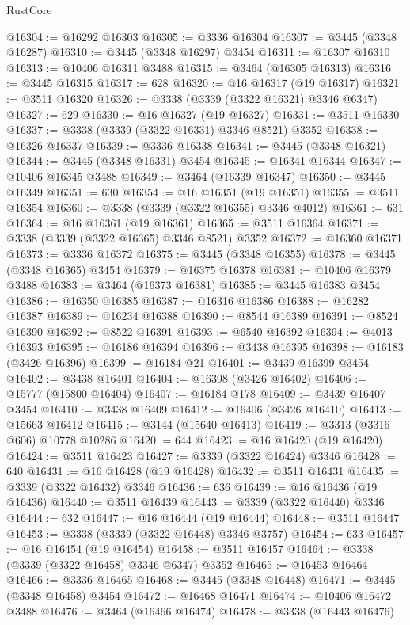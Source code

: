 \begin{lexlean}{RustCore}
\begin{coremodule}
@16304 := @16292 @16303
@16305 := @3336 @16304
@16307 := @3445 (@3348 @16287)
@16310 := @3445 (@3348 @16297) @3454
@16311 := @16307 @16310
@16313 := @10406 @16311 @3488
@16315 := @3464 (@16305 @16313)
@16316 := @3445 @16315
@16317 := 628
@16320 := @16 @16317 (@19 @16317)
@16321 := @3511 @16320
@16326 := @3338 (@3339 (@3322 @16321) @3346 @6347)
@16327 := 629
@16330 := @16 @16327 (@19 @16327)
@16331 := @3511 @16330
@16337 := @3338 (@3339 (@3322 @16331) @3346 @8521) @3352
@16338 := @16326 @16337
@16339 := @3336 @16338
@16341 := @3445 (@3348 @16321)
@16344 := @3445 (@3348 @16331) @3454
@16345 := @16341 @16344
@16347 := @10406 @16345 @3488
@16349 := @3464 (@16339 @16347)
@16350 := @3445 @16349
@16351 := 630
@16354 := @16 @16351 (@19 @16351)
@16355 := @3511 @16354
@16360 := @3338 (@3339 (@3322 @16355) @3346 @4012)
@16361 := 631
@16364 := @16 @16361 (@19 @16361)
@16365 := @3511 @16364
@16371 := @3338 (@3339 (@3322 @16365) @3346 @8521) @3352
@16372 := @16360 @16371
@16373 := @3336 @16372
@16375 := @3445 (@3348 @16355)
@16378 := @3445 (@3348 @16365) @3454
@16379 := @16375 @16378
@16381 := @10406 @16379 @3488
@16383 := @3464 (@16373 @16381)
@16385 := @3445 @16383 @3454
@16386 := @16350 @16385
@16387 := @16316 @16386
@16388 := @16282 @16387
@16389 := @16234 @16388
@16390 := @8544 @16389
@16391 := @8524 @16390
@16392 := @8522 @16391
@16393 := @6540 @16392
@16394 := @4013 @16393
@16395 := @16186 @16394
@16396 := @3438 @16395
@16398 := @16183 (@3426 @16396)
@16399 := @16184 @21
@16401 := @3439 @16399 @3454
@16402 := @3438 @16401
@16404 := @16398 (@3426 @16402)
@16406 := @15777 (@15800 @16404)
@16407 := @16184 @178
@16409 := @3439 @16407 @3454
@16410 := @3438 @16409
@16412 := @16406 (@3426 @16410)
@16413 := @15663 @16412
@16415 := @3144 (@15640 @16413)
@16419 := @3313 (@3316 @606) @10778 @10286
@16420 := 644
@16423 := @16 @16420 (@19 @16420)
@16424 := @3511 @16423
@16427 := @3339 (@3322 @16424) @3346
@16428 := 640
@16431 := @16 @16428 (@19 @16428)
@16432 := @3511 @16431
@16435 := @3339 (@3322 @16432) @3346
@16436 := 636
@16439 := @16 @16436 (@19 @16436)
@16440 := @3511 @16439
@16443 := @3339 (@3322 @16440) @3346
@16444 := 632
@16447 := @16 @16444 (@19 @16444)
@16448 := @3511 @16447
@16453 := @3338 (@3339 (@3322 @16448) @3346 @3757)
@16454 := 633
@16457 := @16 @16454 (@19 @16454)
@16458 := @3511 @16457
@16464 := @3338 (@3339 (@3322 @16458) @3346 @6347) @3352
@16465 := @16453 @16464
@16466 := @3336 @16465
@16468 := @3445 (@3348 @16448)
@16471 := @3445 (@3348 @16458) @3454
@16472 := @16468 @16471
@16474 := @10406 @16472 @3488
@16476 := @3464 (@16466 @16474)
@16478 := @3338 (@16443 @16476)

\end{coremodule}
\end{lexlean}
